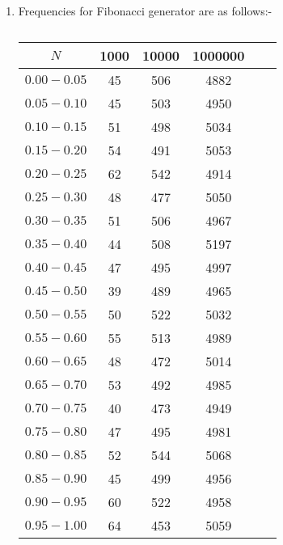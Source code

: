 \documentclass[10pt]{article}
\begin{document}
\begin{enumerate}

\item Frequencies for Fibonacci generator are as follows:- 

\begin{table}[H]
\begin{center}
\begin{tabular}{|c|c|c|c|c|c|}
\hline
$N$ & 1000  & 10000 & 1000000\\
\hline
$0.00-0.05$ & 45 & 506 & 4882\\
\hline
$0.05-0.10$ & 45 & 503 & 4950 \\
\hline
$0.10-0.15$ & 51 & 498 & 5034 \\
\hline
$0.15-0.20$ & 54 & 491 & 5053\\
\hline
$0.20-0.25$ & 62 & 542 & 4914 \\
\hline
$0.25-0.30$ & 48 & 477 & 5050\\
\hline
$0.30-0.35$ & 51 & 506 & 4967\\
\hline
$0.35-0.40$ & 44 & 508 & 5197\\
\hline
$0.40-0.45$ & 47 & 495 & 4997 \\
\hline
$0.45-0.50$ & 39 & 489 & 4965\\
\hline
$0.50-0.55$ & 50 & 522 & 5032\\
\hline
$0.55-0.60$ & 55 & 513 & 4989 \\
\hline
$0.60-0.65$ & 48 & 472 & 5014 \\
\hline
$0.65-0.70$ & 53 & 492 & 4985\\
\hline
$0.70-0.75$ & 40 & 473 & 4949 \\
\hline
$0.75-0.80$ & 47 & 495 & 4981 \\
\hline
$0.80-0.85$ & 52 & 544 & 5068\\
\hline
$0.85-0.90$ & 45 & 499 & 4956 \\
\hline
$0.90-0.95$ & 60 & 522 & 4958 \\
\hline
$0.95-1.00$ & 64 & 453  & 5059 \\
\hline
\end{tabular}
\end{center}
\caption{}
\label{tab:q2_seq1}
\end{table}
\medskip
\end{enumerate}
\end{document}
